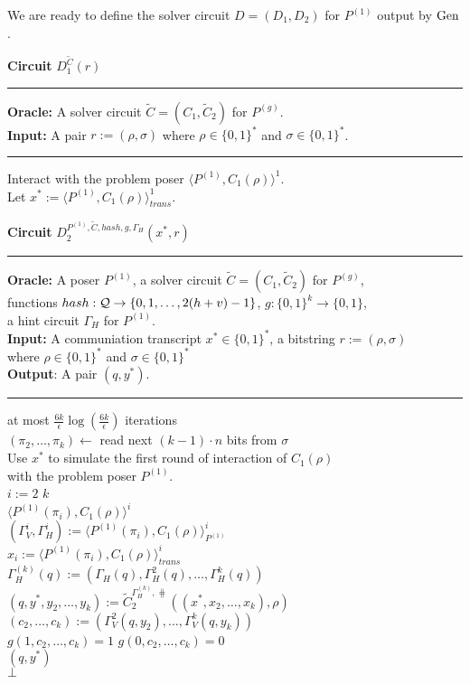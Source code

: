 %
We are ready to define the solver circuit $D = (D_1, D_2)$ for $P^{(1)}$ output by $\operatorname{\text{Gen}}$.
%
\begin{codeblock}
  \textbf{Circuit} $D_1^{\widetilde{C}}(r)$
  \medskip \hrule
  \textbf{Oracle:} A solver circuit $\widetilde{C} = (C_1, \widetilde{C}_2)$ for $P^{(g)}$.\\
  \textbf{Input:} A pair $r := (\rho, \sigma)$ where $ \rho \in \{0,1\}^{*}$ and $\sigma \in \{0,1\}^{*}$.
  \medskip\hrule
  Interact with the problem poser $\langle P^{(1)}, C_1(\rho) \rangle^1$. \\
  Let $x^* := \langle P^{(1)}, C_1(\rho) \rangle^1_{\mathit{trans}}$.
\end{codeblock}
%
\begin{codeblock}
  \textbf{Circuit} $D_2^{P^{(1)}, \widetilde{C}, \mathit{hash}, g,  \Gamma_H}(x^*, r)$
  \medskip \hrule
  \textbf{Oracle:} A poser $P^{(1)}$, a solver circuit $\widetilde{C} = (C_1, \widetilde{C}_2)$ for $P^{(g)}$, \\
  \IndII functions $hash : \mathcal{Q} \rightarrow \{0,1, \dots, 2(h+v)-1\}$, $g:\{0,1\}^k \rightarrow \{0,1\}$, \\
  \IndII a hint circuit $\Gamma_H$ for $P^{(1)}$. \\
  \textbf{Input:} A communiation transcript $x^* \in \{0,1\}^{*}$, a bitstring $r := (\rho, \sigma)$ \\
  \IndII where $\rho \in \{0,1\}^{*}$ and $\sigma \in \{0,1\}^{*}$\\
  \textbf{Output}: A pair $(q, y^*)$.
  \medskip \hrule
  \For at most $\frac{6k}{\epsilon} \log(\frac{6k}{\epsilon})$ iterations \Do \\
  \IndI $(\pi_2, \dots, \pi_k) \leftarrow$ read next $(k-1)\cdot n$ bits from $\sigma$ \\
  \IndI Use $x^*$ to simulate the first round of interaction of $C_1(\rho)$ \\
  \IndI with the problem poser $P^{(1)}$.\\
  \IndI \For $i:=2$ \To $k$ \Do \\
  \IndII \Run $\langle P^{(1)}(\pi_i), C_1(\rho)\rangle^i$ \\
  \IndIII $(\Gamma_V^{i}, \Gamma_H^{i}) := \langle P^{(1)}(\pi_i), C_1(\rho) \rangle^i_{P^{(1)}}$ \\
  \IndIII $x_i := \langle P^{(1)}(\pi_i), C_1(\rho) \rangle^i_{\mathit{trans}}$ \\
  \IndI $\Gamma_H^{(k)}(q) := (\Gamma_H(q), \Gamma_H^{2}(q), \dots, \Gamma_H^{k}(q))$ \\
  \IndI $(q, y^*, y_2, \dots, y_k) := \widetilde{C}_2^{\Gamma_H^{(k)}, \hash}((x^*, x_2, \dotsc, x_k), \rho)$\\
  \IndI $(c_2, \dots, c_k) := (\Gamma_V^2(q, y_2), \dotsc, \Gamma_V^{k}(q, y_k))$ \\
  \IndI \If $g(1, c_{2}, \dots, c_k) = 1$ \And $g(0,c_{2}, \dots, c_k) = 0$ \Then \\
  \IndII \Return $(q, y^*)$ \\
  \Return $\bot$
%
\end{codeblock}
